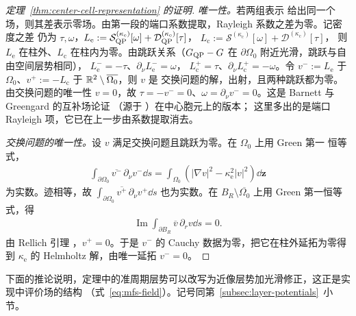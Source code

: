 \begin{proof}[定理~\ref{thm:center-cell-representation} 的证明]
  \emph{唯一性。}若两组表示
  给出同一个场，则其差表示零场。由第一段的端口系数提取，Rayleigh 系数之差为零。记密度之差
  仍为 $\tau,\omega$，$L_{\mathrm e}:=\mathcal S^{(\kappa_{\mathrm e})}_{\mathrm{QP}}[\omega]
  +\mathcal D^{(\kappa_{\mathrm e})}_{\mathrm{QP}}[\tau]$，
  $L_{\mathrm c}:=\mathcal S^{(\kappa_{\mathrm c})}[\omega]+\mathcal D^{(\kappa_{\mathrm c})}[\tau]$，
  则 $L_{\mathrm e}$ 在柱外、$L_{\mathrm c}$ 在柱内为零。由跳跃关系（$G_{\mathrm{QP}}-G$ 在
  $\partial\Omega_0$ 附近光滑，跳跃与自由空间层势相同），
  $L_{\mathrm e}^-=-\tau$、$\partial_\nu L_{\mathrm e}^-=\omega$，
  $L_{\mathrm c}^+=\tau$、$\partial_\nu L_{\mathrm c}^+=-\omega$。令 $v^-:=L_{\mathrm e}$
  于 $\Omega_0$、$v^+:=-L_{\mathrm c}$ 于 $\mathbb{R}^2\setminus\overline{\Omega_0}$，则 $v$ 是
  交换问题的解，出射，且两种跳跃都为零。由交换问题的唯一性 $v=0$，故
  $\tau=-v^-=0$、$\omega=\partial_\nu v^-=0$。这是 Barnett 与 Greengard 的互补场论证
  \cite[附录 A]{BarnettGreengard2010}（源于 \cite{ColtonKress1983}）在中心胞元上的版本；
  这里多出的是端口 Rayleigh 项，它已在上一步由系数提取消去。

  \emph{交换问题的唯一性。}设 $v$ 满足交换问题且跳跃为零。在 $\Omega_0$ 上用 Green 第一
  恒等式，
  \begin{align*}
    \int_{\partial\Omega_0}\overline{v^-}\,\partial_\nu v^-\dd s
    =\int_{\Omega_0}(|\nabla v|^2-\kappa_{\mathrm e}^2|v|^2)\dd\mathbf z
  \end{align*}
  为实数。迹相等，故
  $\int_{\partial\Omega_0}\overline{v^+}\,\partial_\nu v^+\dd s$ 也为实数。在
  $B_R\setminus\overline{\Omega_0}$ 上用 Green 第一恒等式，得
  \begin{align*}
    \operatorname{Im}\int_{\partial B_R}\overline v\,\partial_rv\dd s=0 .
  \end{align*}
  由 Rellich 引理
  \cite{ColtonKress1983}，$v^+=0$。于是 $v^-$ 的 Cauchy 数据为零，把它在柱外延拓为零得到
  $\kappa_{\mathrm e}$ 的 Helmholtz 解，由唯一延拓 $v^-=0$。
\end{proof}

下面的推论说明，定理中的准周期层势可以改写为近像层势加光滑修正，这正是实现中评价场的结构
（式~\eqref{eq:mfs-field}）。记号同第~\ref{subsec:layer-potentials}~小节。

